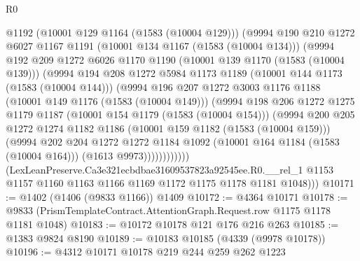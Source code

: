 \begin{lexlean}{R0}
\begin{coremodule}
                @1192
                (@10001 @129 @1164 (@1583 (@10004 @129)))
                (@9994
                  @190
                  @210
                  @1272
                  @6027
                  @1167
                  @1191
                  (@10001 @134 @1167 (@1583 (@10004 @134)))
                  (@9994
                    @192
                    @209
                    @1272
                    @6026
                    @1170
                    @1190
                    (@10001 @139 @1170 (@1583 (@10004 @139)))
                    (@9994
                      @194
                      @208
                      @1272
                      @5984
                      @1173
                      @1189
                      (@10001 @144 @1173 (@1583 (@10004 @144)))
                      (@9994
                        @196
                        @207
                        @1272
                        @3003
                        @1176
                        @1188
                        (@10001 @149 @1176 (@1583 (@10004 @149)))
                        (@9994
                          @198
                          @206
                          @1272
                          @1275
                          @1179
                          @1187
                          (@10001 @154 @1179 (@1583 (@10004 @154)))
                          (@9994
                            @200
                            @205
                            @1272
                            @1274
                            @1182
                            @1186
                            (@10001 @159 @1182 (@1583 (@10004 @159)))
                            (@9994
                              @202
                              @204
                              @1272
                              @1272
                              @1184
                              @1092
                              (@10001 @164 @1184 (@1583 (@10004 @164)))
                              (@1613 @9973))))))))))))
        (LexLeanPreserve.Ca3e321ecbdbae31609537823a92545ee.R0.__rel_1
          @1153
          @1157
          @1160
          @1163
          @1166
          @1169
          @1172
          @1175
          @1178
          @1181
          @1048)))
@10171 := @1402 (@1406 (@9833 @1166)) @1409
@10172 := @4364 @10171
@10178 := @9833 (PrismTemplateContract.AttentionGraph.Request.row @1175 @1178 @1181 @1048)
@10183 := @10172 @10178 @121 @176 @216 @263
@10185 := @1383 @9824 @8190
@10189 := @10183 @10185 (@4339 (@9978 @10178))
@10196 := @4312 @10171 @10178 @219 @244 @259 @262 @1223

\end{coremodule}
\end{lexlean}
